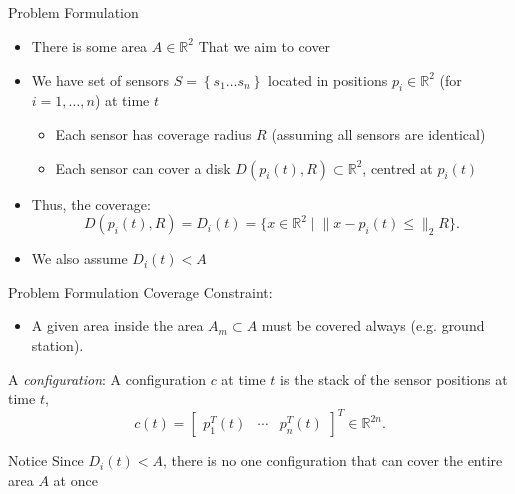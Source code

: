 \documentclass[t]{beamer}
\newcommand{\rR}{\mathbb{R}}
\newcommand{\rsqr}{\mathbb{R}^2}
\newcommand{\bmat}[1]{\begin{bmatrix}#1\end{bmatrix}}
\begin{document}
\subsection[Problem Formulation]{}
\begin{frame}[label=formulation]{Problem Formulation}
\begin{itemize}
\item There is some area $A \in \rR^{2}$ That we aim to cover
\item We have set of sensors $S = \left\{s_1 \ldots s_n\right\}$ located in positions $p_i \in \mathbb{R}^2$ (for $i=1,\ldots,n$) at time $t$
\begin{itemize}
\item Each sensor has coverage radius $R$ (assuming all sensors are identical)
\item Each sensor can cover a disk $D\left(p_{i}\left(t\right), R\right)\subset \rsqr$, centred at $p_{i} \left( t \right)$
\end{itemize}
\item Thus, the coverage: \begin{equation}
D\left(p_{i}\left(t\right),R\right) = D_{i}\left(t\right) = \{ x\in\rsqr \mid \lVert x - p_{i}\left(t\right) \leq \rVert_{2} R \}.
\end{equation}
\item We also assume $D_{i}\left(t\right) < A$
\end{itemize}
\end{frame}

\begin{frame}[label=formulation2]{Problem Formulation}
Coverage Constraint:
\begin{itemize}
\item A given area inside the area $A_{m} \subset A$ must be covered always (e.g. ground station).
\end{itemize}
A \emph{configuration}: A configuration $c$ at time $t$ is the stack of the sensor positions at time $t$,
\begin{equation}
c\left(t\right) = \bmat{
p_{1}^{T}\left(t\right)&\cdots&p_{n}^{T}\left(t\right)}^{T}\in\mathbb{R}^{2n}.
\end{equation}
\begin{alertblock}{Notice}
Since $D_{i}\left( t \right) < A$, there is no one configuration that can cover the entire area $A$ at once
\end{alertblock}
\end{frame}
\end{document}
